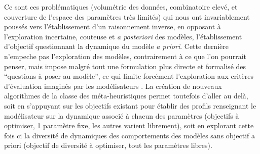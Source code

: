 {Ce sont ces problématiques (volumétrie des données, combinatoire elevé, et couverture de l'espace des paramètres très limités) qui nous ont invariablement poussés vers l'établissement d'un raisonnement inverse, en opposant à l'exploration incertaine, couteuse et \textit{a posteriori} des modèles, l'établissement d'objectif questionnant la dynamique du modèle \textit{a priori}. Cette dernière n'empeche pas l'exploration des modèles, contrairement à ce que l'on pourrait penser, mais impose malgré tout une formulation plus directe et formalisé des \enquote{questions à poser au modèle}, ce qui limite forcément l'exploration aux critères d'évaluation imaginés par les modélisateurs \autocites{Schmitt2015}. La création de nouveaux algorithmes de la classe des méta-heuristiques permet toutefois d'aller au delà, soit en s'appuyant sur les objectifs existant pour établir des profils renseignant le modélisateur sur la dynamique associé à chacun des paramètres (objectifs à optimiser, 1 paramètre fixe, les autres varient librement)\autocite{Reuillon2015}, soit en explorant cette fois ci la diversité de dynamiques des comportements des modèles sans objectif a priori (objectif de diversité à optimiser, tout les paramètres libres). \autocite{Cherel2015}}



